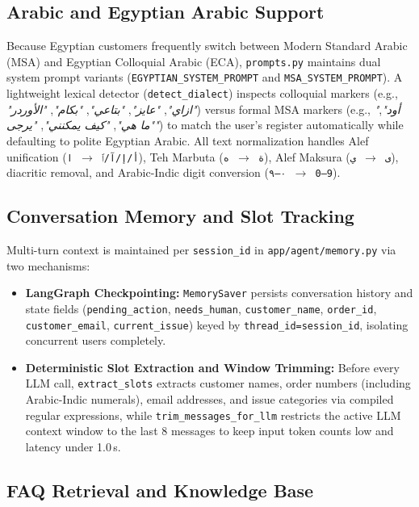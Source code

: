 \subsection{Arabic and Egyptian Arabic Support}
\label{subsec:dialect_support}

Because Egyptian customers frequently switch between Modern Standard Arabic (MSA) and Egyptian Colloquial Arabic (ECA), \texttt{prompts.py} maintains dual system prompt variants (\texttt{EGYPTIAN\_SYSTEM\_PROMPT} and \texttt{MSA\_SYSTEM\_PROMPT}). A lightweight lexical detector (\texttt{detect\_dialect}) inspects colloquial markers (e.g., \textit{"ازاي"}, \textit{"عايز"}, \textit{"بتاعي"}, \textit{"بكام"}, \textit{"الأوردر"}) versus formal MSA markers (e.g., \textit{"أود"}, \textit{"ما هي"}, \textit{"كيف يمكنني"}, \textit{"يرجى"}) to match the user's register automatically while defaulting to polite Egyptian Arabic. All text normalization handles Alef unification (\texttt{أ/إ/آ/ٱ $\rightarrow$ ا}), Teh Marbuta (\texttt{ة $\rightarrow$ ه}), Alef Maksura (\texttt{ى $\rightarrow$ ي}), diacritic removal, and Arabic-Indic digit conversion (\texttt{٠--٩ $\rightarrow$ 0--9}).

\subsection{Conversation Memory and Slot Tracking}
\label{subsec:conversation_memory}

Multi-turn context is maintained per \texttt{session\_id} in \texttt{app/agent/memory.py} via two mechanisms:
\begin{itemize}
    \item \textbf{LangGraph Checkpointing:} \texttt{MemorySaver} persists conversation history and state fields (\texttt{pending\_action}, \texttt{needs\_human}, \texttt{customer\_name}, \texttt{order\_id}, \texttt{customer\_email}, \texttt{current\_issue}) keyed by \texttt{thread\_id=session\_id}, isolating concurrent users completely.
    \item \textbf{Deterministic Slot Extraction and Window Trimming:} Before every LLM call, \texttt{extract\_slots} extracts customer names, order numbers (including Arabic-Indic numerals), email addresses, and issue categories via compiled regular expressions, while \texttt{trim\_messages\_for\_llm} restricts the active LLM context window to the last 8 messages to keep input token counts low and latency under 1.0\,s.
\end{itemize}

\subsection{FAQ Retrieval and Knowledge Base}
\label{subsec:faq_system}

